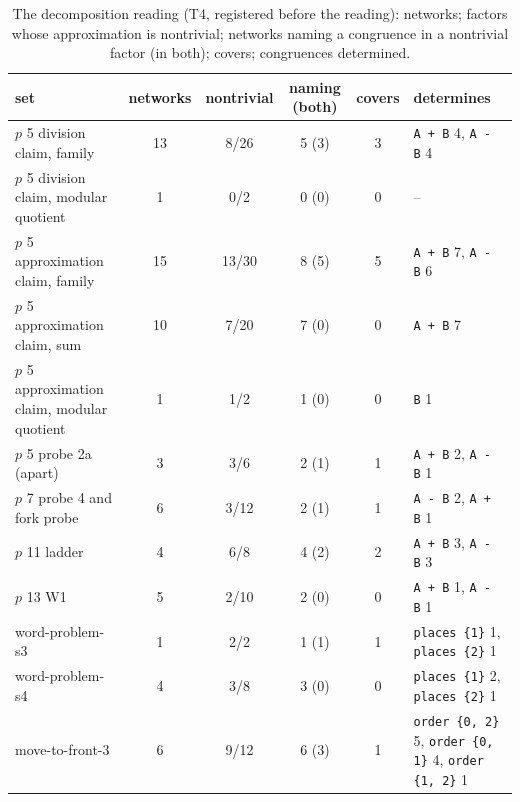 \documentclass[11pt]{article}
\begin{document}
\begin{table}[t]
\centering
\small
\caption{The decomposition reading (T4, registered before the reading): networks; factors whose
approximation is nontrivial; networks naming a congruence in a nontrivial factor (in both);
covers; congruences determined.}
\label{tab:decomposition}
\begin{tabular}{lcccc>{\raggedright\arraybackslash}p{2.6cm}}
\toprule
set & networks & nontrivial & naming (both) & covers & determines \\
\midrule
$p$ 5 division claim, family & 13 & 8/26 & 5 (3) & 3 & \texttt{A + B} 4, \texttt{A - B} 4 \\
$p$ 5 division claim, modular quotient & 1 & 0/2 & 0 (0) & 0 & -- \\
$p$ 5 approximation claim, family & 15 & 13/30 & 8 (5) & 5 & \texttt{A + B} 7, \texttt{A - B} 6 \\
$p$ 5 approximation claim, sum & 10 & 7/20 & 7 (0) & 0 & \texttt{A + B} 7 \\
$p$ 5 approximation claim, modular quotient & 1 & 1/2 & 1 (0) & 0 & \texttt{B} 1 \\
$p$ 5 probe 2a (apart) & 3 & 3/6 & 2 (1) & 1 & \texttt{A + B} 2, \texttt{A - B} 1 \\
$p$ 7 probe 4 and fork probe & 6 & 3/12 & 2 (1) & 1 & \texttt{A - B} 2, \texttt{A + B} 1 \\
$p$ 11 ladder & 4 & 6/8 & 4 (2) & 2 & \texttt{A + B} 3, \texttt{A - B} 3 \\
$p$ 13 W1 & 5 & 2/10 & 2 (0) & 0 & \texttt{A + B} 1, \texttt{A - B} 1 \\
word-problem-s3 & 1 & 2/2 & 1 (1) & 1 & \texttt{places \{1\}} 1, \texttt{places \{2\}} 1 \\
word-problem-s4 & 4 & 3/8 & 3 (0) & 0 & \texttt{places \{1\}} 2, \texttt{places \{2\}} 1 \\
move-to-front-3 & 6 & 9/12 & 6 (3) & 1 & \texttt{order \{0, 2\}} 5, \texttt{order \{0, 1\}} 4, \texttt{order \{1, 2\}} 1 \\
\bottomrule
\end{tabular}
\end{table}
\end{document}
